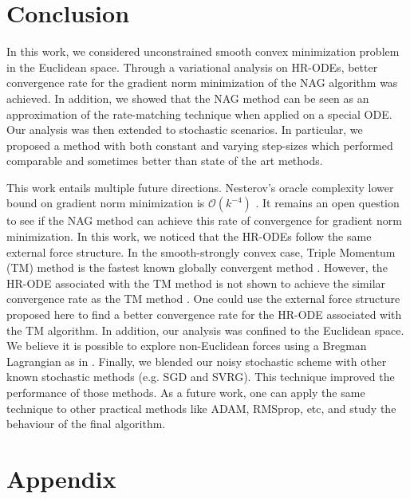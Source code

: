 \documentclass{article}
\theoremstyle{plain}
\theoremstyle{definition}
\theoremstyle{remark}
\begin{document}
\section{Conclusion}\label{sec_conclusion}
In this work, we considered unconstrained smooth convex minimization problem in the Euclidean space. Through a variational analysis on HR-ODEs, better convergence rate for the gradient norm minimization of the NAG algorithm was achieved. In addition, we showed that the NAG method can be seen as an approximation of the rate-matching technique when applied on a special ODE. Our analysis was then extended to stochastic scenarios. In particular, we proposed a method with both constant and varying step-sizes which performed comparable and sometimes better than state of the art methods.\par
This work entails multiple future directions. Nesterov's oracle complexity lower bound on gradient norm minimization is \(\mathcal O({k^{-4}})\) \citep{nesterov2003introductory}. It remains an open question to see if the NAG method can achieve this rate of convergence for gradient norm minimization. In this work, we noticed that the HR-ODEs follow the same external force structure. 
In the smooth-strongly convex case, Triple Momentum (TM) method is the fastest known globally convergent method \citep{7967721}. However, the HR-ODE associated with the TM method is not shown to achieve the similar convergence rate as the TM method \citep{DBLP:conf/cdc/SunGK20}. One could use the external force structure proposed here to find a better convergence rate for the HR-ODE associated with the TM algorithm. In addition, our analysis was confined to the Euclidean space. We believe it is possible to explore non-Euclidean forces using a Bregman Lagrangian as in \citep{WibisonoE7351}.
Finally, we blended our noisy stochastic scheme with other known stochastic methods (e.g. SGD and SVRG). This technique improved the performance of those methods. As a future work, one can apply the same technique to other practical methods like ADAM, RMSprop, etc, and study the behaviour of the final algorithm.









\newpage

\appendix

\section{Appendix}
\end{document}

